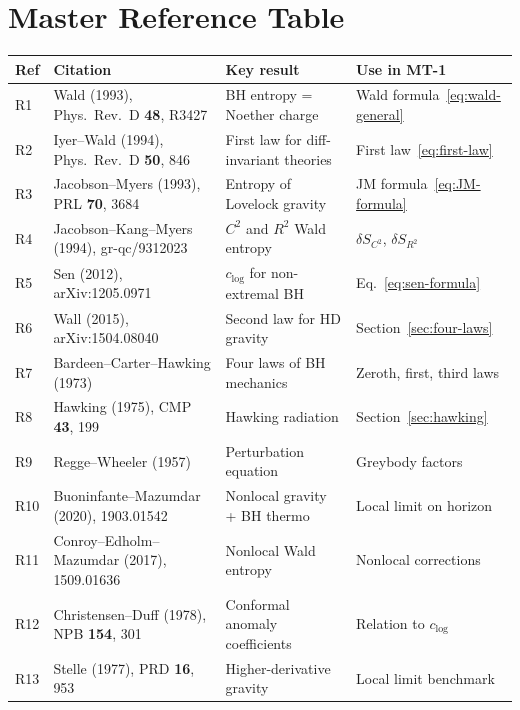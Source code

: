 \documentclass[12pt,a4paper]{article}
\theoremstyle{definition}
\theoremstyle{remark}
\begin{document}
\section{Master Reference Table}
\label{sec:refs}

\begin{center}
\begin{longtable}{p{1.2cm}p{5.2cm}p{3.5cm}p{4cm}}
\toprule
\textbf{Ref} & \textbf{Citation} & \textbf{Key result} & \textbf{Use in MT-1} \\
\midrule
\endhead
R1 & Wald (1993), Phys.\ Rev.\ D \textbf{48}, R3427
  & BH entropy = Noether charge
  & Wald formula~\eqref{eq:wald-general} \\
R2 & Iyer--Wald (1994), Phys.\ Rev.\ D \textbf{50}, 846
  & First law for diff-invariant theories
  & First law~\eqref{eq:first-law} \\
R3 & Jacobson--Myers (1993), PRL \textbf{70}, 3684
  & Entropy of Lovelock gravity
  & JM formula~\eqref{eq:JM-formula} \\
R4 & Jacobson--Kang--Myers (1994), gr-qc/9312023
  & $C^2$ and $R^2$ Wald entropy
  & $\delta S_{C^2}$, $\delta S_{R^2}$ \\
R5 & Sen (2012), arXiv:1205.0971
  & $c_{\log}$ for non-extremal BH
  & Eq.~\eqref{eq:sen-formula} \\
R6 & Wall (2015), arXiv:1504.08040
  & Second law for HD gravity
  & Section~\ref{sec:four-laws} \\
R7 & Bardeen--Carter--Hawking (1973)
  & Four laws of BH mechanics
  & Zeroth, first, third laws \\
R8 & Hawking (1975), CMP \textbf{43}, 199
  & Hawking radiation
  & Section~\ref{sec:hawking} \\
R9 & Regge--Wheeler (1957)
  & Perturbation equation
  & Greybody factors \\
R10 & Buoninfante--Mazumdar (2020), 1903.01542
  & Nonlocal gravity + BH thermo
  & Local limit on horizon \\
R11 & Conroy--Edholm--Mazumdar (2017), 1509.01636
  & Nonlocal Wald entropy
  & Nonlocal corrections \\
R12 & Christensen--Duff (1978), NPB \textbf{154}, 301
  & Conformal anomaly coefficients
  & Relation to $c_{\log}$ \\
R13 & Stelle (1977), PRD \textbf{16}, 953
  & Higher-derivative gravity
  & Local limit benchmark \\

\end{longtable}
\end{center}
\end{document}
